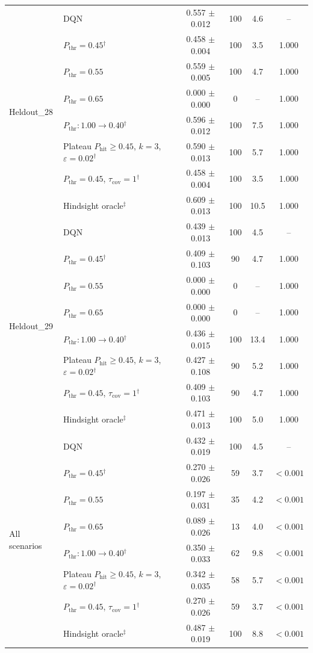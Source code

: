 \begin{table}[htbp]
\begin{tabular}{llcccc}
\multirow{8}{*}{Heldout\_28} & DQN & 0.557 $\pm$ 0.012 & 100 & 4.6 & -- \\
 & $P_{\mathrm{thr}}=0.45$$^{\dagger}$ & 0.458 $\pm$ 0.004 & 100 & 3.5 & 1.000 \\
 & $P_{\mathrm{thr}}=0.55$ & 0.559 $\pm$ 0.005 & 100 & 4.7 & 1.000 \\
 & $P_{\mathrm{thr}}=0.65$ & 0.000 $\pm$ 0.000 & 0 & -- & 1.000 \\
 & $P_{\mathrm{thr}}: 1.00 \to 0.40$$^{\dagger}$ & 0.596 $\pm$ 0.012 & 100 & 7.5 & 1.000 \\
 & Plateau $P_{\mathrm{hit}}\geq0.45$, $k=3$, $\varepsilon=0.02$$^{\dagger}$ & 0.590 $\pm$ 0.013 & 100 & 5.7 & 1.000 \\
 & $P_{\mathrm{thr}}=0.45$, $\tau_{\mathrm{cov}}=1$$^{\dagger}$ & 0.458 $\pm$ 0.004 & 100 & 3.5 & 1.000 \\
 & Hindsight oracle$^{\ddagger}$ & 0.609 $\pm$ 0.013 & 100 & 10.5 & 1.000 \\
\midrule
\multirow{8}{*}{Heldout\_29} & DQN & 0.439 $\pm$ 0.013 & 100 & 4.5 & -- \\
 & $P_{\mathrm{thr}}=0.45$$^{\dagger}$ & 0.409 $\pm$ 0.103 & 90 & 4.7 & 1.000 \\
 & $P_{\mathrm{thr}}=0.55$ & 0.000 $\pm$ 0.000 & 0 & -- & 1.000 \\
 & $P_{\mathrm{thr}}=0.65$ & 0.000 $\pm$ 0.000 & 0 & -- & 1.000 \\
 & $P_{\mathrm{thr}}: 1.00 \to 0.40$$^{\dagger}$ & 0.436 $\pm$ 0.015 & 100 & 13.4 & 1.000 \\
 & Plateau $P_{\mathrm{hit}}\geq0.45$, $k=3$, $\varepsilon=0.02$$^{\dagger}$ & 0.427 $\pm$ 0.108 & 90 & 5.2 & 1.000 \\
 & $P_{\mathrm{thr}}=0.45$, $\tau_{\mathrm{cov}}=1$$^{\dagger}$ & 0.409 $\pm$ 0.103 & 90 & 4.7 & 1.000 \\
 & Hindsight oracle$^{\ddagger}$ & 0.471 $\pm$ 0.013 & 100 & 5.0 & 1.000 \\
\midrule
\multirow{8}{*}{All scenarios} & DQN & 0.432 $\pm$ 0.019 & 100 & 4.5 & -- \\
 & $P_{\mathrm{thr}}=0.45$$^{\dagger}$ & 0.270 $\pm$ 0.026 & 59 & 3.7 & $<0.001$ \\
 & $P_{\mathrm{thr}}=0.55$ & 0.197 $\pm$ 0.031 & 35 & 4.2 & $<0.001$ \\
 & $P_{\mathrm{thr}}=0.65$ & 0.089 $\pm$ 0.026 & 13 & 4.0 & $<0.001$ \\
 & $P_{\mathrm{thr}}: 1.00 \to 0.40$$^{\dagger}$ & 0.350 $\pm$ 0.033 & 62 & 9.8 & $<0.001$ \\
 & Plateau $P_{\mathrm{hit}}\geq0.45$, $k=3$, $\varepsilon=0.02$$^{\dagger}$ & 0.342 $\pm$ 0.035 & 58 & 5.7 & $<0.001$ \\
 & $P_{\mathrm{thr}}=0.45$, $\tau_{\mathrm{cov}}=1$$^{\dagger}$ & 0.270 $\pm$ 0.026 & 59 & 3.7 & $<0.001$ \\
 & Hindsight oracle$^{\ddagger}$ & 0.487 $\pm$ 0.019 & 100 & 8.8 & $<0.001$ \\
\bottomrule
\end{tabular}
\end{table}
